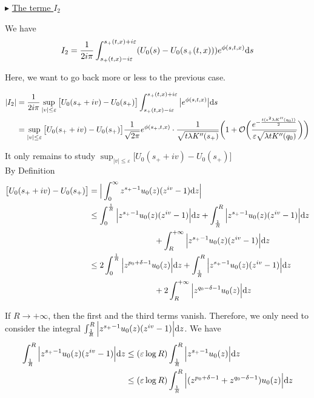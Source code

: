 \documentclass[11pt]{amsart}
\newcommand{\ul}[1]{\underline{#1}}
\begin{document}
$\blacktriangleright$ \ul{The terme $I_2$}

We have 
    \begin{equation*}
        I_2 = \frac{1}{2i \pi} \int_{s_+(t,x) - i\varepsilon}^{s_+(t,x) + i\varepsilon} (U_0(s) -  U_0(s_+(t,x)))  e^{\phi(s,t,x)} \mathrm ds 
    \end{equation*}
    
Here, we want to go back more or less to the previous case. 

    \begin{align*}
         |I_2| 
         &= 
         \frac{1}{2i \pi} \sup_{|v| \leq \varepsilon} \big[U_0(s_+ + iv) -  U_0(s_+) \big] \int_{s_+(t,x) - i\varepsilon}^{s_+(t,x) + i\varepsilon} \big| e^{\phi(s,t,x)} \big| \mathrm ds \\
         &=
         \sup_{|v| \leq \varepsilon} \big[U_0(s_+ + iv) -  U_0(s_+) \big] \frac{1}{\sqrt{2\pi}} e^{\phi(s_+, t, x)} \cdot \frac{1}{\sqrt{t \lambda K''(s_+)}} \bigg( 
    1 + \mathcal{O}\bigg(\frac{e^{-\frac{t(\varepsilon^2 \lambda K''(q_0))}{2}} }{\varepsilon \sqrt{\lambda tK''(q_0)}}\bigg) \bigg)
    \end{align*}
    
It only remains to study $  \sup_{|v| \leq \varepsilon} \big[U_0(s_+ + iv) -  U_0(s_+) \big]$ \\

By Definition
\begin{align*}
    \big[U_0(s_+ + iv) -  U_0(s_+) \big]
    &= \Big| \int_0^\infty  z^{s_+ - 1}u_0(z) (z^{iv} - 1) \mathrm dz \Big| \\
    &\leq \int_0^{\frac{1}{R}} \Big|  z^{s_+ - 1}u_0(z) (z^{iv} - 1) \Big| \mathrm dz
        + \int_{\frac{1}{R}}^R \Big|  z^{s_+ - 1}u_0(z) (z^{iv} - 1) \Big| \mathrm dz \\
        &\qquad \qquad \qquad \qquad
        + \int_R^{+\infty} \Big|  z^{s_+ - 1}u_0(z) (z^{iv} - 1) \Big| \mathrm dz \\
    &\leq 2 \int_0^{\frac{1}{R}} \Big|  z^{p_0 + \delta - 1}u_0(z) \Big| \mathrm dz
        +  \int_{\frac{1}{R}}^R \Big|  z^{s_+ - 1}u_0(z) (z^{iv} - 1) \Big| \mathrm dz \\
        &\qquad \qquad \qquad \qquad
        + 2 \int_R^{+\infty} \Big|  z^{q_0 - \delta - 1}u_0(z) \Big| \mathrm dz \\
\end{align*}

If $R \to + \infty$, then the first and the third terms vanish. Therefore, we only need to consider the integral $ \int_{\frac{1}{R}}^R \Big|  z^{s_+ - 1}u_0(z) (z^{iv} - 1) \Big| \mathrm dz$. We have
    \begin{align*}
         \int_{\frac{1}{R}}^R \Big|  z^{s_+ - 1}u_0(z) (z^{iv} - 1) \Big| \mathrm dz 
         &\leq 
          (\varepsilon \log R)\int_{\frac{1}{R}}^R \Big|  z^{s_+ - 1}u_0(z) \Big| \mathrm dz \\
         &\leq 
          (\varepsilon \log R)\int_{\frac{1}{R}}^R \Big|  (z^{p_0 + \delta - 1} + z^{q_0 - \delta - 1}) u_0(z) \Big| \mathrm dz \\
    \end{align*}
\end{document}
